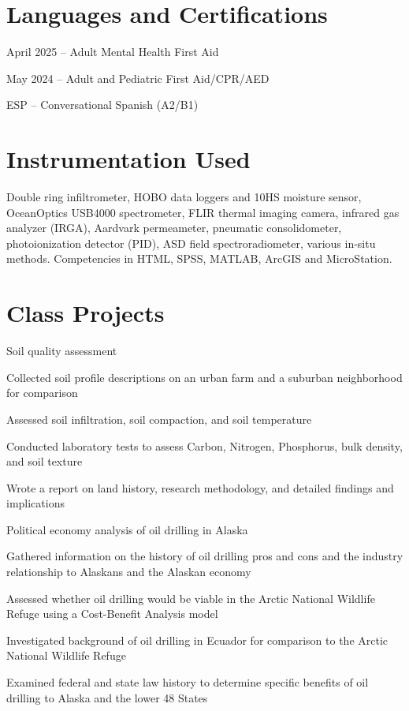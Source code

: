 \documentclass{../styles/cv}
\begin{document}
\section{Languages and Certifications}
\resumesublistbegin
    \item April 2025 -- Adult Mental Health First Aid
    \item May 2024 -- Adult and Pediatric First Aid/CPR/AED
    \item ESP -- Conversational Spanish (A2/B1)
\resumesublistend

\section{Instrumentation Used}
Double ring infiltrometer, HOBO data loggers and 10HS moisture sensor, OceanOptics USB4000 spectrometer, FLIR thermal imaging camera, infrared gas analyzer (IRGA), Aardvark permeameter, pneumatic consolidometer, photoionization detector (PID), ASD field spectroradiometer, various in-situ methods. Competencies in HTML, SPSS, MATLAB, ArcGIS and MicroStation.

\section{Class Projects}

\subsectiondate
    {Soil quality assessment}
    {}
\resumesublistbegin
    \item Collected soil profile descriptions on an urban farm and a suburban neighborhood for comparison
    \item Assessed soil infiltration, soil compaction, and soil temperature
    \item Conducted laboratory tests to assess Carbon, Nitrogen, Phosphorus, bulk density, and soil texture
    \item Wrote a report on land history, research methodology, and detailed findings and implications
\resumesublistend

\subsectiondate
    {Political economy analysis of oil drilling in Alaska}
    {}
\resumesublistbegin
    \item Gathered information on the history of oil drilling pros and cons and the industry relationship to Alaskans and the Alaskan economy
    \item Assessed whether oil drilling would be viable in the Arctic National Wildlife Refuge using a Cost-Benefit Analysis model
    \item Investigated background of oil drilling in Ecuador for comparison to the Arctic National Wildlife Refuge
    \item Examined federal and state law history to determine specific benefits of oil drilling to Alaska and the lower 48 States
\resumesublistend
\end{document}
